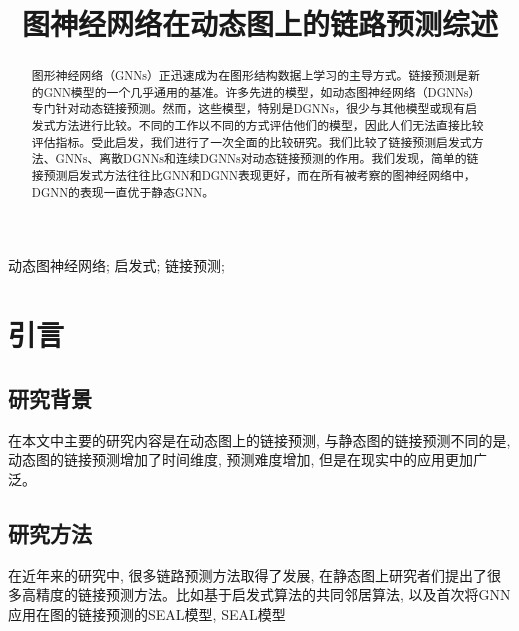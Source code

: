 \documentclass[conference]{IEEEtran}
\begin{document}
% 

\title{图神经网络在动态图上的链路预测综述}

\author{
}

\maketitle



\begin{abstract}
图形神经网络（GNNs）正迅速成为在图形结构数据上学习的主导方式。链接预测是新的GNN模型的一个几乎通用的基准。许多先进的模型，如动态图神经网络（DGNNs）专门针对动态链接预测。然而，这些模型，特别是DGNNs，很少与其他模型或现有启发式方法进行比较。不同的工作以不同的方式评估他们的模型，因此人们无法直接比较评估指标。受此启发，我们进行了一次全面的比较研究。我们比较了链接预测启发式方法、GNNs、离散DGNNs和连续DGNNs对动态链接预测的作用。我们发现，简单的链接预测启发式方法往往比GNN和DGNN表现更好，而在所有被考察的图神经网络中，DGNN的表现一直优于静态GNN。
\end{abstract}

\begin{IEEEkeywords}
动态图神经网络; 启发式; 链接预测;
\end{IEEEkeywords}

\section{引言}
\subsection{研究背景}
在本文中主要的研究内容是在动态图上的链接预测, 与静态图的链接预测不同的是, 动态图的链接预测增加了时间维度, 预测难度增加, 但是在现实中的应用更加广泛。

\subsection{研究方法}
在近年来的研究中, 很多链路预测方法取得了发展, 在静态图上研究者们提出了很多高精度的链接预测方法。比如基于启发式算法的共同邻居算法\cite{zhang2008recommendation}, 
以及首次将GNN应用在图的链接预测的SEAL模型\cite{zhang2008recommendation}, SEAL模型
\end{document}
